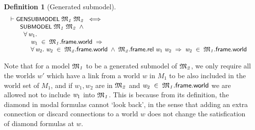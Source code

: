 \documentclass[letterpaper]{article}
\newtheorem{defn}{Definition}
\renewcommand{\HOLConst}[1]{{\textsf{\upshape\small #1}}}
\renewcommand{\HOLinline}[1]{\ensuremath{#1}}
\newenvironment{holmath}{\begin{displaymath}\begin{array}{l}}{\end{array}\end{displaymath}\ignorespacesafterend}
\begin{document}

\begin{defn}[Generated submodel]
\begin{holmath}
  \ensuremath{\HOLTokenTurnstile}\HOLConst{GENSUBMODEL}\;\HOLFreeVar{\ensuremath{\mathfrak{M}\sb{1}}}\;\HOLFreeVar{\ensuremath{\mathfrak{M}\sb{2}}}\;\HOLSymConst{\HOLTokenEquiv{}}\\
\;\;\;\;\;\;\;\HOLConst{SUBMODEL}\;\HOLFreeVar{\ensuremath{\mathfrak{M}\sb{1}}}\;\HOLFreeVar{\ensuremath{\mathfrak{M}\sb{2}}}\;\HOLSymConst{\HOLTokenConj{}}\\
\;\;\;\;\;\;\;\;\;\HOLSymConst{\HOLTokenForall{}}\HOLBoundVar{w\sb{\mathrm{1}}}.\\
\;\;\;\;\;\;\;\;\;\;\;\;\;\HOLBoundVar{w\sb{\mathrm{1}}}\;\HOLSymConst{\HOLTokenIn{}}\;\HOLFreeVar{\ensuremath{\mathfrak{M}\sb{1}}}.\HOLFieldName{frame}.\HOLFieldName{world}\;\HOLSymConst{\HOLTokenImp{}}\\
\;\;\;\;\;\;\;\;\;\;\;\;\;\HOLSymConst{\HOLTokenForall{}}\HOLBoundVar{w\sb{\mathrm{2}}}.\;\HOLBoundVar{w\sb{\mathrm{2}}}\;\HOLSymConst{\HOLTokenIn{}}\;\HOLFreeVar{\ensuremath{\mathfrak{M}\sb{2}}}.\HOLFieldName{frame}.\HOLFieldName{world}\;\HOLSymConst{\HOLTokenConj{}}\;\HOLFreeVar{\ensuremath{\mathfrak{M}\sb{2}}}.\HOLFieldName{frame}.\HOLFieldName{rel}\;\HOLBoundVar{w\sb{\mathrm{1}}}\;\HOLBoundVar{w\sb{\mathrm{2}}}\;\HOLSymConst{\HOLTokenImp{}}\;\HOLBoundVar{w\sb{\mathrm{2}}}\;\HOLSymConst{\HOLTokenIn{}}\;\HOLFreeVar{\ensuremath{\mathfrak{M}\sb{1}}}.\HOLFieldName{frame}.\HOLFieldName{world}
\end{holmath}
\end{defn}

Note that for a model \HOLinline{\HOLFreeVar{\ensuremath{\mathfrak{M}\sb{1}}}} to be a generated submodel of \HOLinline{\HOLFreeVar{\ensuremath{\mathfrak{M}\sb{2}}}}, we only require all the worlds $w'$ which have a link from a world $w$ in $M_1$ to be also included in the world set of $M_1$, and if $w_1,w_2$ are in \HOLinline{\HOLFreeVar{\ensuremath{\mathfrak{M}\sb{2}}}} and \HOLinline{\HOLFreeVar{w\sb{\mathrm{2}}}\;\HOLSymConst{\HOLTokenIn{}}\;\HOLFreeVar{\ensuremath{\mathfrak{M}\sb{1}}}.\HOLFieldName{frame}.\HOLFieldName{world}} we are allowed not to include \HOLinline{\HOLFreeVar{w\sb{\mathrm{1}}}} into \HOLinline{\HOLFreeVar{\ensuremath{\mathfrak{M}\sb{1}}}}. This is because from its definition, the diamond in modal formulas cannot `look back', in the sense that adding an extra connection or discard connections to a world $w$ does not change the satisfication of diamond formulas at $w$. 
\end{document}
